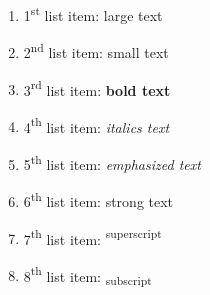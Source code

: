 \documentclass[12pt]{article}
\begin{document}
\begin{enumerate}
\item 1{\textsuperscript{st}} list item: {\Large large text}
\item 2{\textsuperscript{nd}} list item: {\scriptsize small text}
\item 3{\textsuperscript{rd}} list item: {\textbf{bold text}}
\item 4{\textsuperscript{th}} list item: {\textit{italics text}}
\item 5{\textsuperscript{th}} list item: {\emph{emphasized text}}
\item 6{\textsuperscript{th}} list item: {\textmd{strong text}}
\item 7{\textsuperscript{th}} list item: {\textsuperscript{superscript}}
\item 8{\textsuperscript{th}} list item: {\textsubscript{subscript}}
\end{enumerate}
\end{document}
